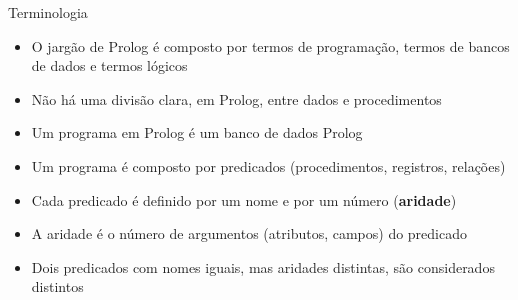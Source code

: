 \begin{frame}[fragile]{Terminologia}

    \begin{itemize}
        \item O jargão de Prolog é composto por termos de programação, termos de bancos de 
            dados e termos lógicos

        \item Não há uma divisão clara, em Prolog, entre dados e procedimentos

        \item Um programa em Prolog é um banco de dados Prolog

        \item Um programa é composto por predicados (procedimentos, registros, relações)

        \item Cada predicado é definido por um nome e por um número (\textbf{aridade})

        \item A aridade é o número de argumentos (atributos, campos) do predicado

        \item Dois predicados com nomes iguais, mas aridades distintas, são considerados 
            distintos
    \end{itemize}

\end{frame}

